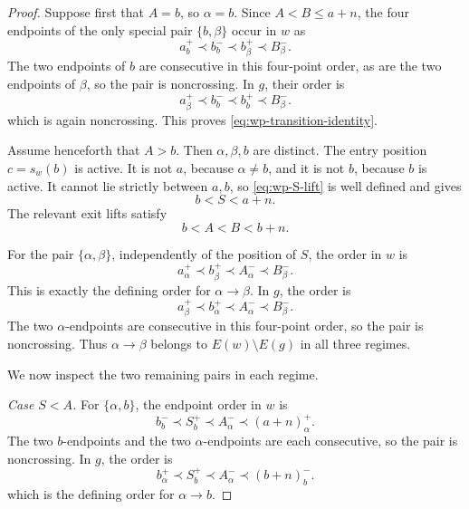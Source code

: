 \documentclass[11pt]{article}
\theoremstyle{definition}
\begin{document}
\begin{proof}
Suppose first that \(A=b\), so \(\alpha=b\). Since \(A<B\le a+n\), the four
endpoints of the only special pair \(\{b,\beta\}\) occur in \(w\) as
\begin{equation}
   a_b^+
   \prec
   b_b^-
   \prec
   b_\beta^+
   \prec
   B_\beta^-.
   \label{eq:wp-Aeqb-w}
\end{equation}
The two endpoints of \(b\) are consecutive in this four-point order, as are
the two endpoints of \(\beta\), so the pair is noncrossing. In \(g\), their
order is
\begin{equation}
   a_\beta^+
   \prec
   b_b^-
   \prec
   b_b^+
   \prec
   B_\beta^-.
   \label{eq:wp-Aeqb-g}
\end{equation}
which is again noncrossing. This proves
\eqref{eq:wp-transition-identity}.

Assume henceforth that \(A>b\). Then \(\alpha,\beta,b\) are distinct. The
entry position \(c=s_w(b)\) is active. It is not \(a\), because
\(\alpha\ne b\), and it is not \(b\), because \(b\) is active. It cannot lie
strictly between \(a,b\), so \eqref{eq:wp-S-lift} is well defined and gives
\begin{equation}
   b<S<a+n.
   \label{eq:wp-S-bounds}
\end{equation}
The relevant exit lifts satisfy
\begin{equation}
   b<A<B<b+n.
   \label{eq:wp-special-exit-order}
\end{equation}

For the pair \(\{\alpha,\beta\}\), independently of the position of \(S\),
the order in \(w\) is
\begin{equation}
   a_\alpha^+
   \prec
   b_\beta^+
   \prec
   A_\alpha^-
   \prec
   B_\beta^-.
   \label{eq:wp-alphabeta-w}
\end{equation}
This is exactly the defining order for \(\alpha\to\beta\). In \(g\), the
order is
\begin{equation}
   a_\beta^+
   \prec
   b_\alpha^+
   \prec
   A_\alpha^-
   \prec
   B_\beta^-.
   \label{eq:wp-alphabeta-g}
\end{equation}
The two \(\alpha\)-endpoints are consecutive in this four-point order, so the
pair is noncrossing. Thus \(\alpha\to\beta\) belongs to
\(E(w)\setminus E(g)\) in all three regimes.

We now inspect the two remaining pairs in each regime.

\smallskip
\noindent\emph{Case \(S<A\).}
For \(\{\alpha,b\}\), the endpoint order in \(w\) is
\begin{equation}
   b_b^-
   \prec
   S_b^+
   \prec
   A_\alpha^-
   \prec
   (a+n)_\alpha^+.
   \label{eq:wp-left-alphab-w}
\end{equation}
The two \(b\)-endpoints and the two \(\alpha\)-endpoints are each consecutive,
so the pair is noncrossing. In \(g\), the order is
\begin{equation}
   b_\alpha^+
   \prec
   S_b^+
   \prec
   A_\alpha^-
   \prec
   (b+n)_b^-.
   \label{eq:wp-left-alphab-g}
\end{equation}
which is the defining order for \(\alpha\to b\).


\end{proof}
\end{document}
